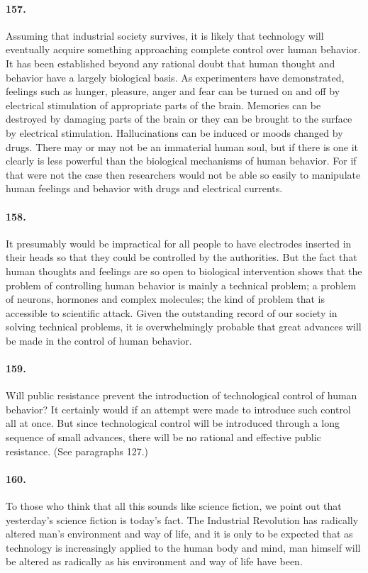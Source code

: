 \documentclass[12pt]{book}
\begin{document}
\paragraph{157.}  Assuming that industrial society survives, it is likely that technology will eventually acquire something approaching complete control over human behavior. It has been established beyond any rational doubt that human thought and behavior have a largely biological basis. As experimenters have demonstrated, feelings such as hunger, pleasure, anger and fear can be turned on and off by electrical stimulation of appropriate parts of the brain. Memories can be destroyed by damaging parts of the brain or they can be brought to the surface by electrical stimulation. Hallucinations can be induced or moods changed by drugs. There may or may not be an immaterial human soul, but if there is one it clearly is less powerful than the biological mechanisms of human behavior. For if that were not the case then researchers would not be able so easily to manipulate human feelings and behavior with drugs and electrical currents.


\paragraph{158.}  It presumably would be impractical for all people to have electrodes inserted in their heads so that they could be controlled by the authorities.  But the fact that human thoughts and feelings are so open to biological intervention shows that the problem of controlling human behavior is mainly a technical problem; a problem of neurons, hormones and complex molecules; the kind of problem that is accessible to scientific attack. Given the outstanding record of our society in solving technical problems, it is overwhelmingly probable that great advances will be made in the control of human behavior.


\paragraph{159.} Will public resistance prevent the introduction of technological control of human behavior? It certainly would if an attempt were made to introduce such control all at once. But since technological control will be introduced through a long sequence of small advances, there will be no rational and effective public resistance. (See paragraphs 127.)


\paragraph{160.}  To those who think that all this sounds like science fiction, we point out that yesterday's science fiction is today's fact. The Industrial Revolution has radically altered man's environment and way of life, and it is only to be expected that as technology is increasingly applied to the human body and mind, man himself will be altered as radically as his environment and way of life have been.
\end{document}
